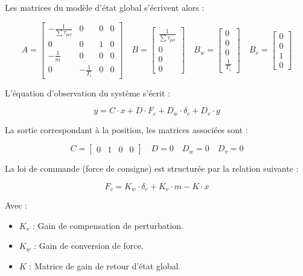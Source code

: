 Les matrices du modèle d'état global s'écrivent alors :

\begin{equation}
    A = \begin{bmatrix} -\frac{1}{\sum\tau_{pct}} & 0 & 0 & 0 \\ 0 & 0 & 1 & 0 \\ -\frac{1}{m} & 0 & 0 & 0 \\ 0 & -\frac{1}{T_i} & 0 & 0 \end{bmatrix} \quad B = \begin{bmatrix} \frac{1}{\sum\tau_{pct}} \\ 0 \\ 0 \\ 0 \end{bmatrix}\quad B_w = \begin{bmatrix} 0 \\ 0 \\ 0 \\ \frac{1}{T_i} \end{bmatrix}\quad B_v = \begin{bmatrix} 0 \\ 0 \\ 1 \\ 0 \end{bmatrix}
\end{equation}

L'équation d'observation du système s'écrit :

\begin{equation}
    y = C \cdot x + D \cdot F_c + D_w \cdot \delta_c + D_v \cdot g
\end{equation}

La sortie correspondant à la position, les matrices associées sont :

\begin{equation}
    C = \begin{bmatrix} 0 & 1 & 0 & 0 \end{bmatrix}\quad D = 0\quad D_w = 0 \quad D_v = 0
\end{equation}

La loi de commande (force de consigne) est structurée par la relation suivante :

\begin{equation}
    F_c = K_w \cdot \delta_c + K_v \cdot m - K \cdot x
\end{equation}

Avec :
\begin{itemize}
    \item $K_v$ : Gain de compensation de perturbation.
    \item $K_w$ : Gain de conversion de force.
    \item $K$ : Matrice de gain de retour d'état global.
\end{itemize}

